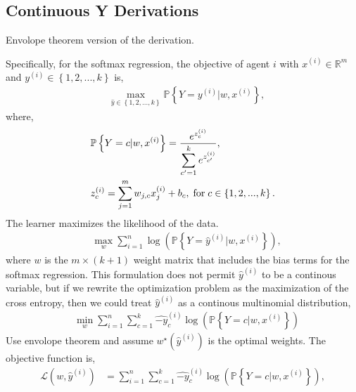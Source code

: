 \documentclass{article}
\begin{document}
\subsection{Continuous Y Derivations}
\begin{tcolorbox}[colback = white]
Envolope theorem version of the derivation.
\end{tcolorbox}
Specifically, for the softmax regression, the objective of agent $i $ with $x^{\left(i\right)} \in \mathbb{R}^{m}$ and $y^{\left(i\right)} \in \left\{1, 2, ..., k \right\}$ is,
\begin{align*}
&  \displaystyle\max_{\hat{y} \in \left\{1, 2, ..., k \right\}} \mathbb{P}\left\{Y = y^{\left(i\right)} | w, x^{\left(i\right)}\right\},
\end{align*}
where,
\begin{align*}
&  \mathbb{P}\left\{Y = c | w, x^{\left(i\right)}\right\} = \dfrac{e^{z_{c}^{\left(i\right)}}}{\displaystyle\sum_{c'=1}^{k} e^{z_{c'}^{\left(i\right)}}},
\\ &  z_{c}^{\left(i\right)} = \displaystyle\sum_{j=1}^{m} w_{j,c} x_{j}^{\left(i\right)} + b_{c} , \text{\;for\;} c \in \left\{1, 2, ..., k\right\}.
\end{align*}
The learner maximizes the likelihood of the data.
\begin{align*}
&\displaystyle\max_{w} \displaystyle\sum_{i=1}^{n} \log\left(\mathbb{P}\left\{Y = \hat{y} ^{\left(i\right)} | w, x^{\left(i\right)}\right\}\right),
\end{align*}
where $w $ is the $m  \times \left(k  + 1\right)$ weight matrix that includes the bias terms for the softmax regression.
\newline \newline
This formulation does not permit $\hat{y} ^{\left(i\right)}$ to be a continous variable, but if we rewrite the optimization problem as the maximization of the cross entropy, then we could treat $\hat{y} ^{\left(i\right)}$ as a continous multinomial distribution,
\begin{align*}
&\displaystyle\min_{w} \displaystyle\sum_{i=1}^{n} \displaystyle\sum_{c=1}^{k} \hat{-y}_{c}^{\left(i\right)} \log\left(\mathbb{P}\left\{Y = c | w, x^{\left(i\right)}\right\}\right)
\end{align*}
Use envolope theorem and assume $w^\star \left(\hat{y} ^{\left(i\right)}\right)$ is the optimal weights. The objective function is,
\begin{align*}
\mathcal{L}\left(w, \hat{y} ^{\left(i\right)}\right) &= \displaystyle\sum_{i=1}^{n} \displaystyle\sum_{c=1}^{k} \hat{-y}_{c}^{\left(i\right)} \log\left(\mathbb{P}\left\{Y = c | w, x^{\left(i\right)}\right\}\right),
\end{align*}
\end{document}
